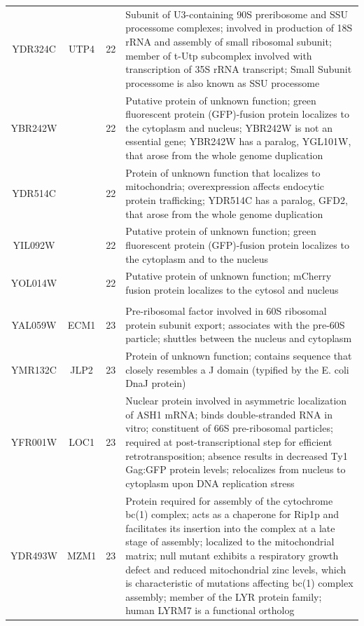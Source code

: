 \documentclass[]{article}
\begin{document}
\begin{longtable}{@{\extracolsep{3pt}} cccp{85mm}}
YDR324C & UTP4 & 22 & Subunit of U3-containing 90S preribosome and SSU processome complexes; involved in production of 18S rRNA and assembly of small ribosomal subunit; member of t-Utp subcomplex involved with transcription of 35S rRNA transcript; Small Subunit processome is also known as SSU processome \\ 
YBR242W &  & 22 & Putative protein of unknown function; green fluorescent protein (GFP)-fusion protein localizes to the cytoplasm and nucleus; YBR242W is not an essential gene; YBR242W has a paralog, YGL101W, that arose from the whole genome duplication \\ 
YDR514C &  & 22 & Protein of unknown function that localizes to mitochondria; overexpression affects endocytic protein trafficking; YDR514C has a paralog, GFD2, that arose from the whole genome duplication \\ 
YIL092W &  & 22 & Putative protein of unknown function; green fluorescent protein (GFP)-fusion protein localizes to the cytoplasm and to the nucleus \\ 
YOL014W &  & 22 & Putative protein of unknown function; mCherry fusion protein localizes to the cytosol and nucleus \\   \hline \\ [-1.8ex] 
YAL059W & ECM1 & 23 & Pre-ribosomal factor involved in 60S ribosomal protein subunit export; associates with the pre-60S particle; shuttles between the nucleus and cytoplasm \\ 
YMR132C & JLP2 & 23 & Protein of unknown function; contains sequence that closely resembles a J domain (typified by the E. coli DnaJ protein) \\ 
YFR001W & LOC1 & 23 & Nuclear protein involved in asymmetric localization of ASH1 mRNA; binds double-stranded RNA in vitro; constituent of 66S pre-ribosomal particles; required at post-transcriptional step for efficient retrotransposition; absence results in decreased Ty1 Gag:GFP protein levels; relocalizes from nucleus to cytoplasm upon DNA replication stress \\ 
YDR493W & MZM1 & 23 & Protein required for assembly of the cytochrome bc(1) complex; acts as a chaperone for Rip1p and facilitates its insertion into the complex at a late stage of assembly; localized to the mitochondrial matrix; null mutant exhibits a respiratory growth defect and reduced mitochondrial zinc levels, which is characteristic of mutations affecting bc(1) complex assembly; member of the LYR protein family; human LYRM7 is a functional ortholog \\ 

\end{longtable}
\end{document}
